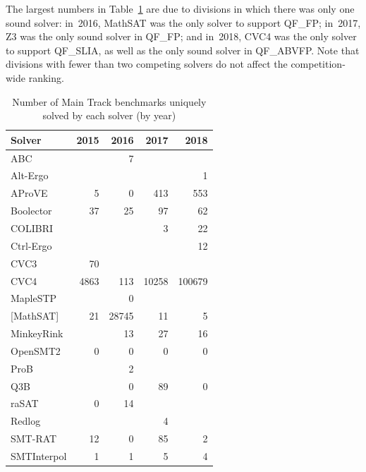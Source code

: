 \documentclass[dvipsnames,table,twoside,11pt]{article}
\newcommand{\maintrack}{Main Track\xspace}
\begin{document}
The largest numbers in Table~\ref{table:unique-solutions} are due to
divisions in which there was only one sound solver: in~2016, MathSAT
was the only solver to support QF\_FP; in~2017, Z3 was the only sound
solver in QF\_FP; and in~2018, CVC4 was the only solver to support
QF\_SLIA, as well as the only sound solver in QF\_ABVFP.  Note that
divisions with fewer than two competing solvers do not affect the
competition-wide ranking.

\begin{table}
  \caption{Number of \maintrack benchmarks uniquely solved by each
    solver (by year)}
  \label{table:unique-solutions}
  \centering
  \begin{tabular}{lrrrr}
    \toprule
    Solver & 2015 & 2016 & 2017 & 2018 \\
    \midrule
    ABC               &       & 7     &       &        \\
    Alt-Ergo          &       &       &       & 1      \\
    AProVE            & 5     & 0     & 413   & 553    \\
    Boolector         & 37    & 25    & 97    & 62     \\
    COLIBRI           &       &       & 3     & 22     \\
    Ctrl-Ergo         &       &       &       & 12     \\
    CVC3              & 70    &       &       &        \\
    CVC4              & 4863  & 113   & 10258 & 100679 \\
    MapleSTP          &       & 0     &       &        \\
    {[}MathSAT{]}     & 21    & 28745 & 11    & 5      \\
    MinkeyRink        &       & 13    & 27    & 16     \\
    OpenSMT2          & 0     & 0     & 0     & 0      \\
    ProB              &       & 2     &       &        \\
    Q3B               &       & 0     & 89    & 0      \\
    raSAT             & 0     & 14    &       &        \\
    Redlog            &       &       & 4     &        \\
    SMT-RAT           & 12    & 0     & 85    & 2      \\
    SMTInterpol       & 1     & 1     & 5     & 4      \\

\end{tabular}
\end{table}
\end{document}
